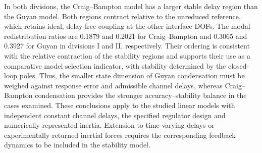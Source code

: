 \documentclass[a4paper,fleqn,review,12pt]{cas-sc}
\numberwithin{equation}{section}
\begin{document}
In both divisions, the Craig--Bampton model has a larger stable delay region than the Guyan model. Both regions contract relative to the unreduced reference, which retains ideal, delay-free coupling at the other interface DOFs. The modal redistribution ratios are 0.1879 and 0.2021 for Craig--Bampton and 0.3065 and 0.3927 for Guyan in divisions I and II, respectively. Their ordering is consistent with the relative contraction of the stability regions and supports their use as a comparative model-selection indicator, with stability determined by the closed-loop poles. Thus, the smaller state dimension of Guyan condensation must be weighed against response error and admissible channel delays, whereas Craig--Bampton condensation provides the stronger accuracy--stability balance in the cases examined. These conclusions apply to the studied linear models with independent constant channel delays, the specified regulator design and numerically represented inertia. Extension to time-varying delays or experimentally returned inertial forces requires the corresponding feedback dynamics to be included in the stability model.




\end{document}
